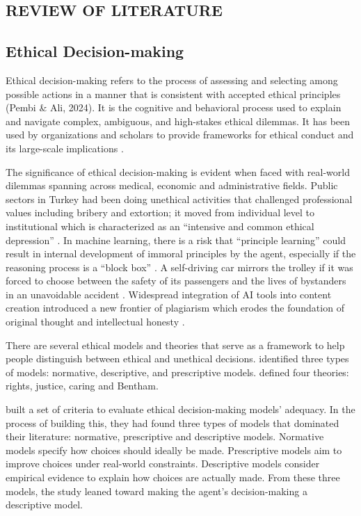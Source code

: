 \documentclass{icsthesis}
\begin{document}
\begin{mainmatter}
				\section{REVIEW OF LITERATURE}
			\subsection{Ethical Decision-making}
Ethical decision-making refers to the process of assessing and selecting among possible actions in a manner that is consistent with accepted ethical principles (Pembi \& Ali, 2024). It is the cognitive and behavioral process used to explain and navigate complex, ambiguous, and high-stakes ethical dilemmas. It has been used by organizations and scholars to provide frameworks for ethical conduct and its large-scale implications \citep{MacDougall2014}. 

The significance of ethical decision-making is evident when faced with real-world dilemmas spanning across medical, economic and administrative fields. Public sectors in Turkey had been doing unethical activities that challenged professional values including bribery and extortion; it moved from individual level to institutional which is characterized as an “intensive and common ethical depression” \citep{Cigeroglu2019}.  In machine learning, there is a risk that “principle learning” could result in internal development of immoral principles by the agent, especially if the reasoning process is a “block box” \citep{Miranda2010}.  A self-driving car mirrors the trolley if it was forced to choose between the safety of its passengers and the lives of bystanders in an unavoidable accident \citep{KremerHerman2024b}. Widespread integration of AI tools into content creation introduced a new frontier of plagiarism which erodes the foundation of original thought and intellectual honesty \citep{Joshi2025}. 

There are several ethical models and theories that serve as a framework to help people distinguish between ethical and unethical decisions. \citet{Whittier2006} identified three types of models: normative, descriptive, and prescriptive models. \citet{Pembi2024} defined four theories: rights, justice, caring and Bentham.

\citet{Whittier2006} built a set of criteria to evaluate ethical decision-making models’ adequacy. In the process of building this, they had found three types of models that dominated their literature: normative, prescriptive and descriptive models. Normative models specify how choices should ideally be made. Prescriptive models aim to improve choices under real-world constraints. Descriptive models consider empirical evidence to explain how choices are actually made. From these three models, the study leaned toward making the agent’s decision-making a descriptive model.


\end{mainmatter}
\end{document}
